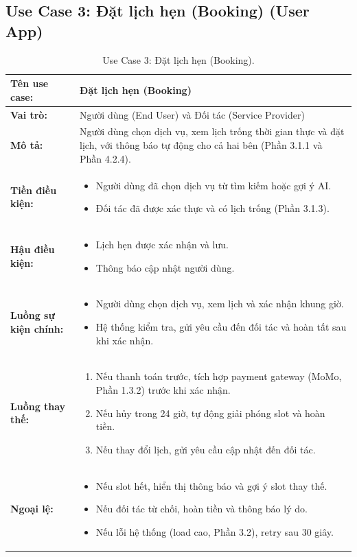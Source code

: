 \subsection{Use Case 3: Đặt lịch hẹn (Booking) (User App)}

\begin{table}[H]
\centering
\begin{tabular}{|p{3cm}|p{12cm}|}
\hline
\textbf{Tên use case:} & Đặt lịch hẹn (Booking) \\
\hline
\textbf{Vai trò:} & Người dùng (End User) và Đối tác (Service Provider) \\
\hline
\textbf{Mô tả:} & Người dùng chọn dịch vụ, xem lịch trống thời gian thực và đặt lịch, với thông báo tự động cho cả hai bên (Phần 3.1.1 và Phần 4.2.4). \\
\hline
\textbf{Tiền điều kiện:} & 
\begin{itemize}
\item Người dùng đã chọn dịch vụ từ tìm kiếm hoặc gợi ý AI.
\item Đối tác đã được xác thực và có lịch trống (Phần 3.1.3).
\end{itemize} \\
\hline
\textbf{Hậu điều kiện:} & 
\begin{itemize}
\item Lịch hẹn được xác nhận và lưu.
\item Thông báo cập nhật người dùng.
\end{itemize} \\
\hline
\textbf{Luồng sự kiện chính:} & 
\begin{itemize}
\item Người dùng chọn dịch vụ, xem lịch và xác nhận khung giờ.
\item Hệ thống kiểm tra, gửi yêu cầu đến đối tác và hoàn tất sau khi xác nhận.
\end{itemize} \\
\hline
\textbf{Luồng thay thế:} & 
\begin{enumerate}
\item[a.] Nếu thanh toán trước, tích hợp payment gateway (MoMo, Phần 1.3.2) trước khi xác nhận.
\item[b.] Nếu hủy trong 24 giờ, tự động giải phóng slot và hoàn tiền.
\item[c.] Nếu thay đổi lịch, gửi yêu cầu cập nhật đến đối tác.
\end{enumerate} \\
\hline
\textbf{Ngoại lệ:} & 
\begin{itemize}
\item Nếu slot hết, hiển thị thông báo và gợi ý slot thay thế.
\item Nếu đối tác từ chối, hoàn tiền và thông báo lý do.
\item Nếu lỗi hệ thống (load cao, Phần 3.2), retry sau 30 giây.
\end{itemize} \\
\hline
\end{tabular}
\caption{Use Case 3: Đặt lịch hẹn (Booking).}
\label{tab:uc3}
\end{table}

